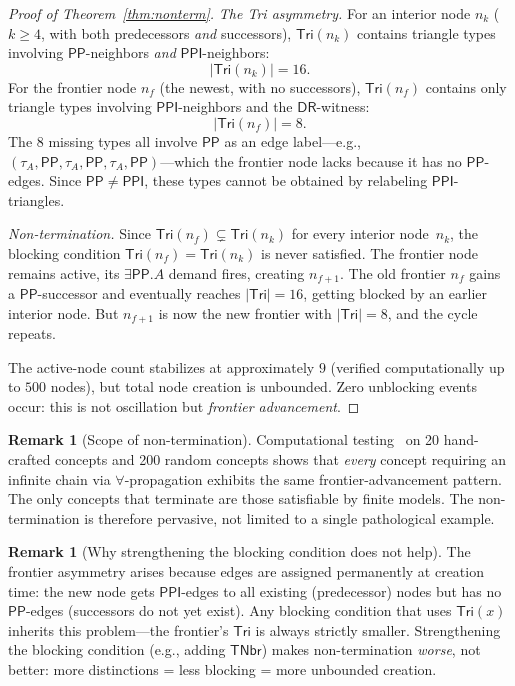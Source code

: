 \documentclass[a4paper,11pt]{article}
\theoremstyle{definition}
\newtheorem{remark}[theorem]{Remark}
\newcommand{\DR}{\ensuremath{\mathsf{DR}}}
\newcommand{\PP}{\ensuremath{\mathsf{PP}}}
\newcommand{\PPI}{\ensuremath{\mathsf{PPI}}}
\newcommand{\Tri}{\ensuremath{\mathsf{Tri}}}
\newcommand{\TNbr}{\ensuremath{\mathsf{TNbr}}}
\begin{document}
\begin{proof}[Proof of Theorem~\ref{thm:nonterm}]
\emph{The Tri asymmetry.}
For an interior node $n_k$ ($k \ge 4$, with both predecessors
\emph{and} successors), $\Tri(n_k)$ contains triangle types
involving $\PP$-neighbors \emph{and} $\PPI$-neighbors:
\[
|\Tri(n_k)| = 16.
\]
For the frontier node $n_f$ (the newest, with no successors),
$\Tri(n_f)$ contains only triangle types involving
$\PPI$-neighbors and the $\DR$-witness:
\[
|\Tri(n_f)| = 8.
\]
The 8 missing types all involve $\PP$ as an edge label---e.g.,
$(\tau_A, \PP, \tau_A, \PP, \tau_A, \PP)$---which the frontier
node lacks because it has no $\PP$-edges.  Since
$\PP \neq \PPI$, these types cannot be obtained by
relabeling $\PPI$-triangles.

\emph{Non-termination.}
Since $\Tri(n_f) \subsetneq \Tri(n_k)$ for every interior
node~$n_k$, the blocking condition $\Tri(n_f) = \Tri(n_k)$
is never satisfied.  The frontier node remains active, its
$\exists\PP.A$ demand fires, creating $n_{f+1}$.  The old
frontier $n_f$ gains a $\PP$-successor and eventually reaches
$|\Tri| = 16$, getting blocked by an earlier interior node.
But $n_{f+1}$ is now the new frontier with $|\Tri| = 8$, and
the cycle repeats.

The active-node count stabilizes at approximately $9$
(verified computationally up to $500$ nodes), but total
node creation is unbounded.  Zero unblocking events occur:
this is not oscillation but \emph{frontier advancement}.
\end{proof}

\begin{remark}[Scope of non-termination]
Computational testing~\cite{NonTermScript} on 20 hand-crafted
concepts and 200 random concepts shows that \emph{every}
concept requiring an infinite chain via
$\forall$-propagation exhibits the same frontier-advancement
pattern.  The only concepts that terminate are those satisfiable
by finite models.  The non-termination is therefore pervasive,
not limited to a single pathological example.
\end{remark}

\begin{remark}[Why strengthening the blocking condition
  does not help]\label{rem:stronger-fails}
The frontier asymmetry arises because edges are assigned
permanently at creation time: the new node gets $\PPI$-edges
to all existing (predecessor) nodes but has no $\PP$-edges
(successors do not yet exist).  Any blocking condition that
uses $\Tri(x)$ inherits this problem---the frontier's $\Tri$
is always strictly smaller.  Strengthening the blocking
condition (e.g., adding $\TNbr$) makes non-termination
\emph{worse}, not better: more distinctions = less blocking
= more unbounded creation.
\end{remark}
\end{document}
